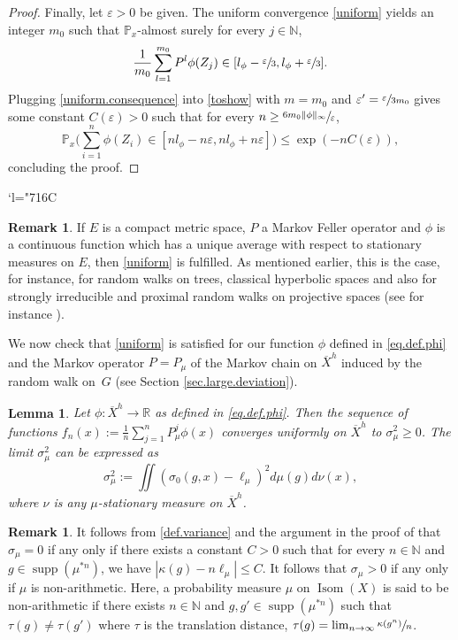 \documentclass[10pt]{amsart}
\newcommand{\Changelback}{\mathcode`l="716C}
\let\epsilon\varepsilon
\let\ts\textstyle
\theoremstyle{plain}
\newtheorem{lemma}[theorem]{Lemma}
\theoremstyle{definition}
\newtheorem{remark}[theorem]{Remark}
\newcommand\R{\mathbb{R}}
\newcommand\p{\mathbb{P}}
\newcommand\N{\mathbb{N}}
\DeclareMathOperator\Isom{Isom}
\DeclareMathOperator\supp{supp}
\begin{document}
\begin{proof}
Finally, let $\epsilon>0$ be given. The uniform convergence \eqref{uniform} yields an integer $m_0$ such that $\p_x$-almost surely for every $j\in\N$,
\begin{equation}\label{uniform.consequence}\frac{1}{m_0}\sum_{l=1}^{m_0} {P^l\phi(Z_{j})}\in [l_{\phi}-\sfrac{\epsilon}{3}, l_{\phi}+\sfrac{\epsilon}{3}].\end{equation}
Plugging \eqref{uniform.consequence} into \eqref{toshow} with $m=m_0$ and
$\epsilon'=\sfrac{\epsilon}{3m_0}$ gives some constant $C(\epsilon)>0$ such that for every $n\geq \sfrac{6m_0 \|\phi\|_{\infty}}{\epsilon}$,
\[
\p_x \bigl(\ts
\sum_{i=1}^n\phi(Z_i) \in [nl_{\phi} - n\epsilon , nl_{\phi} +n\epsilon] \bigr)\leq \exp(-n C(\epsilon)),
\]
concluding the proof.
\end{proof}
\Changelback

\begin{remark}
If $E$ is a compact metric space, $P$ a Markov Feller operator and $\phi$ is a continuous function which has a unique average with respect to stationary measures on $E$, then \eqref{uniform} is fulfilled. As mentioned earlier, this is the case, for instance, for random walks on trees, classical hyperbolic spaces and also for strongly irreducible and proximal random walks on projective spaces (see for instance \cite{BQ.book}).
\end{remark}

We now check that \eqref{uniform} is satisfied for our function $\phi$ defined in \eqref{eq.def.phi} and the Markov operator $P=P_\mu$ of the Markov chain on $\overline{X}^h$ induced by the random walk on~$G$ (see Section \ref{sec.large.deviation}).

\begin{lemma}\label{lemma.unif.conv}
Let $\phi:\overline{X}^h \to \R$ as defined in \eqref{eq.def.phi}. Then the sequence of functions $f_n(x):=\frac{1}{n}\sum_{j=1}^n{P^j_\mu \phi(x)}$ converges uniformly on $\overline{X}^h$ to $\sigma^2_\mu\geq 0$. The limit $\sigma_{\mu}^2$ can be expressed as
\begin{equation}\label{def.variance}\sigma_{\mu}^2:=\iint{(\sigma_0(g,x)-\ell_{\mu})^2 d\mu(g) d\nu(x)},
\end{equation}
where $\nu$ is any $\mu$-stationary measure on $\overline{X}^h$.
\end{lemma}

\begin{remark}\label{rk.sigma.positive}
It follows from \eqref{def.variance} and the argument in the proof of \cite[Th.\,4.7.b]{BQ.hyperbolic} that $\sigma_\mu=0$ if any only if there exists a constant $C>0$ such that for every $n \in \N$ and $g\in \supp(\mu^{\ast n})$, we have $|\kappa(g)-n\ell_{\mu}|\leq C$. It follows that $\sigma_\mu>0$ if any only if $\mu$ is non-arithmetic.
Here, a probability measure $\mu$ on $\Isom(X)$ is said to be non-arithmetic if there exists $n \in \N$ and $g,g' \in \supp(\mu^{\ast n})$ such that $\tau(g) \neq \tau(g')$ where $\tau$ is the translation distance, $\tau(g)=\lim_{n \to \infty}\sfrac{\kappa(g^n)}{n}$.
\end{remark}
\end{document}
